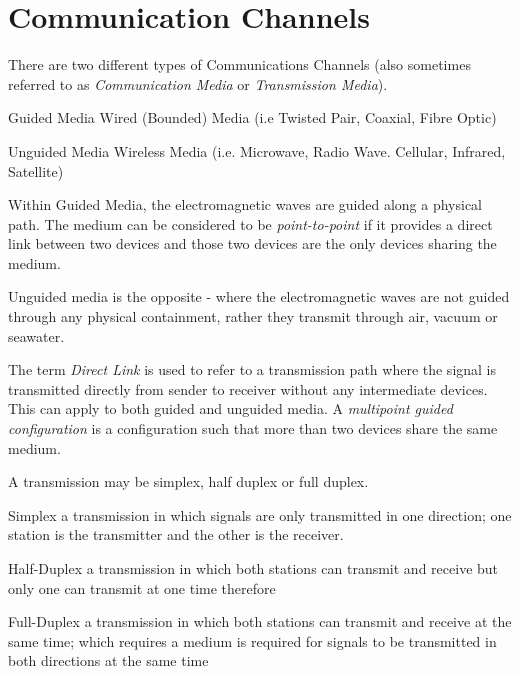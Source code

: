 
\section{Communication Channels}
There are two different types of Communications Channels (also sometimes referred to as \textit{Communication Media} or \textit{Transmission Media}).

\begin{define}
    \item[Guided Media] Wired (Bounded) Media (i.e Twisted Pair, Coaxial, Fibre Optic)
    \item[Unguided Media] Wireless Media (i.e. Microwave, Radio Wave. Cellular, Infrared, Satellite)
\end{define}

Within Guided Media, the electromagnetic waves are guided along a physical path. The medium can be considered to be \textit{point-to-point} if it provides a direct link between two devices and those two devices are the only devices sharing the medium.

Unguided media is the opposite - where the electromagnetic waves are not guided through any physical containment, rather they transmit through air, vacuum or seawater. 

The term \textit{Direct Link} is used to refer to a transmission path where the signal is transmitted directly from sender to receiver without any intermediate devices. This can apply to both guided and unguided media. A \textit{multipoint guided configuration} is a configuration such that more than two devices share the same medium. 

A transmission may be simplex, half duplex or full duplex.

\begin{define}
    \item[Simplex] a transmission in which signals are only transmitted in one direction; one station is the transmitter and the other is the receiver.
    \item[Half-Duplex] a transmission in which both stations can transmit and receive but only one can transmit at one time therefore
    \item[Full-Duplex] a transmission in which both stations can transmit and receive at the same time; which requires a medium is required for signals to be transmitted in both directions at the same time
\end{define}

